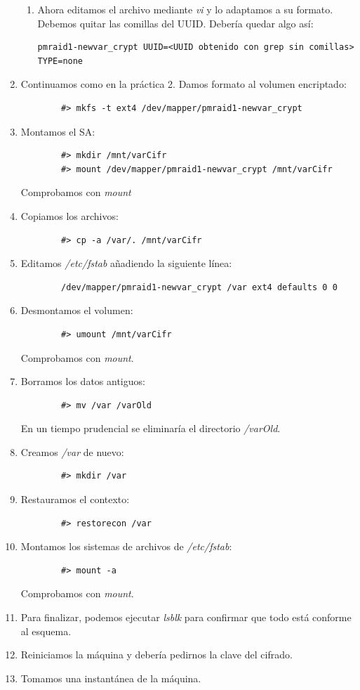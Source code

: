 \documentclass[12pt,spanish]{article}
\begin{document}
\begin{enumerate}
\begin{enumerate}
			\item Ahora editamos el archivo mediante \textit{vi} y lo adaptamos a su formato. Debemos quitar las comillas del UUID. Debería quedar algo así:
			\begin{lstlisting}[xleftmargin=-3.8cm]
				pmraid1-newvar_crypt UUID=<UUID obtenido con grep sin comillas> TYPE=none
			\end{lstlisting}
	\end{enumerate}
	\item Continuamos como en la práctica 2. Damos formato al volumen encriptado:
	\begin{lstlisting}
		#> mkfs -t ext4 /dev/mapper/pmraid1-newvar_crypt
	\end{lstlisting}
	\item Montamos el SA:
	\begin{lstlisting}
		#> mkdir /mnt/varCifr
		#> mount /dev/mapper/pmraid1-newvar_crypt /mnt/varCifr
	\end{lstlisting}
	Comprobamos con \textit{mount}
	\item Copiamos los archivos:
	\begin{lstlisting}
		#> cp -a /var/. /mnt/varCifr
	\end{lstlisting}
	\item Editamos \textit{/etc/fstab} añadiendo la siguiente línea:
	\begin{lstlisting}
		/dev/mapper/pmraid1-newvar_crypt /var ext4 defaults 0 0
	\end{lstlisting}
	\item Desmontamos el volumen:
	\begin{lstlisting}
		#> umount /mnt/varCifr
	\end{lstlisting}
	Comprobamos con \textit{mount}.
	\item Borramos los datos antiguos:
	\begin{lstlisting}
		#> mv /var /varOld
	\end{lstlisting}
	En un tiempo prudencial se eliminaría el directorio \textit{/varOld}.
	\item Creamos \textit{/var} de nuevo:
	\begin{lstlisting}
		#> mkdir /var
	\end{lstlisting}
	\item Restauramos el contexto:
	\begin{lstlisting}
		#> restorecon /var
	\end{lstlisting}
	\item Montamos los sistemas de archivos de \textit{/etc/fstab}:
	\begin{lstlisting}
		#> mount -a
	\end{lstlisting}
	Comprobamos con \textit{mount}.
	\item Para finalizar, podemos ejecutar \textit{lsblk} para confirmar que todo está conforme al esquema.
	\item Reiniciamos la máquina y debería pedirnos la clave del cifrado.
	\item Tomamos una instantánea de la máquina.
\end{enumerate}
\end{document}

